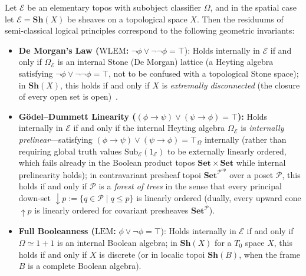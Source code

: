 \begin{theorem}\label{thm:omega-dictionary}%
%

Let $\mathcal{E}$ be an elementary topos with subobject classifier $\Omega$, and in the spatial case let $\mathcal{E} = \mathbf{Sh}(X)$ be sheaves on a topological space $X$. Then the residuums of semi-classical logical principles correspond to the following geometric invariants:

\begin{itemize}

  \item \textbf{De Morgan's Law ($\mathrm{WLEM}$:} $\neg\phi \vee \neg\neg\phi = \top$): Holds internally in $\mathcal{E}$ if and only if $\Omega_{\mathcal{E}}$ is an internal Stone (De Morgan) lattice (a Heyting algebra satisfying $\neg\phi \vee \neg\neg\phi = \top$, not to be confused with a topological Stone space); in $\mathbf{Sh}(X)$, this holds if and only if $X$ is \emph{extremally disconnected} (the closure of every open set is open)~\cite{Johnstone82}.

  \item \textbf{G\"odel--Dummett Linearity ($(\phi \to \psi) \vee (\psi \to \phi) = \top$):} Holds internally in $\mathcal{E}$ if and only if the internal Heyting algebra $\Omega_{\mathcal{E}}$ is \emph{internally prelinear}---satisfying $(\phi \to \psi) \vee (\psi \to \phi) = \top_{\Omega}$ internally (rather than requiring global truth values $\mathrm{Sub}_{\mathcal{E}}(1_{\mathcal{E}})$ to be externally linearly ordered, which fails already in the Boolean product topos $\mathbf{Set} \times \mathbf{Set}$ while internal prelinearity holds); in contravariant presheaf topoi $\mathbf{Set}^{\mathcal{P}^{\mathrm{op}}}$ over a poset $\mathcal{P}$, this holds if and only if $\mathcal{P}$ is a \emph{forest of trees} in the sense that every principal down-set $\downarrow p := \{q \in \mathcal{P} \mid q \le p\}$ is linearly ordered (dually, every upward cone $\uparrow p$ is linearly ordered for covariant presheaves $\mathbf{Set}^{\mathcal{P}}$).

  \item \textbf{Full Booleanness ($\mathrm{LEM}$:} $\phi \vee \neg\phi = \top$): Holds internally in $\mathcal{E}$ if and only if $\Omega \simeq 1+1$ is an internal Boolean algebra; in $\mathbf{Sh}(X)$ for a $T_0$ space $X$, this holds if and only if $X$ is discrete (or in localic topoi $\mathbf{Sh}(B)$, when the frame $B$ is a complete Boolean algebra).

\end{itemize}

\end{theorem}

